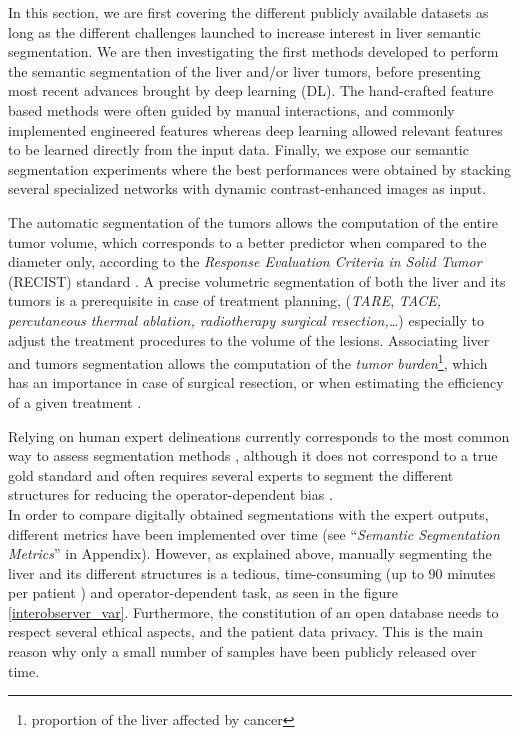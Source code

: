 In this section, we are first covering the different publicly available datasets as long
as the different challenges launched to increase interest in liver
semantic segmentation. We are then investigating the first methods
developed to perform the semantic segmentation of the liver and/or liver
tumors, before presenting most recent advances brought by deep learning (DL).
The hand-crafted feature based methods were often guided by manual interactions,
and commonly implemented engineered features whereas deep learning
allowed relevant features to be learned directly from the input data.
Finally, we  expose our semantic segmentation experiments where 
the best performances were obtained by stacking several 
specialized networks with dynamic contrast-enhanced images as input.


The automatic segmentation of the tumors allows the computation 
of the entire tumor volume, which corresponds to a better predictor when
compared to the diameter only, according to the \emph{Response
	Evaluation Criteria in Solid Tumor} (RECIST) standard \cite{Eisenhauer2008, Ye2017}. A precise
volumetric segmentation of both the liver and its tumors is a
prerequisite in case of treatment planning, (\emph{TARE}, \emph{TACE,
	percutaneous thermal ablation, radiotherapy surgical resection,\ldots{}}) especially to adjust the treatment procedures to the volume of the lesions\cite{Al-Nahhas2014, Yamada1983, Albain2009, Rossi96}. Associating liver and tumors
segmentation allows the computation of the \emph{tumor burden}\footnote{proportion of the liver affected by cancer}, which
has an importance in case of surgical resection, or when estimating the
efficiency of a given treatment \cite{Nordlinger1996, Jagannath1986, Gobbi2004, Bauknecht2010, Bornemann2007, Heussel2007, Kuhnigk2006, Puesken2010}.


Relying on human expert
delineations currently corresponds to the most common way to assess
segmentation methods \cite{Bilic2019}, although it does not correspond 
to a true gold standard \cite{Heimann2009} and often requires several experts to segment the
different structures for reducing the operator-dependent bias \cite{Echegaray2015, Moltz2009}.\\
In order to compare digitally obtained segmentations with the expert
outputs, different metrics have been implemented over time (see
``\emph{Semantic Segmentation Metrics}'' in Appendix). However, as
explained above, manually segmenting the liver and its different
structures is a tedious, time-consuming (up to 90 minutes per patient
\cite{Gotra2017}) and operator-dependent task, as seen in the figure \ref{interobserver_var}.
Furthermore, the constitution of an open database needs to respect
several ethical aspects, and the patient data privacy. This is the main
reason why only a small number of samples have been publicly released
over time.

